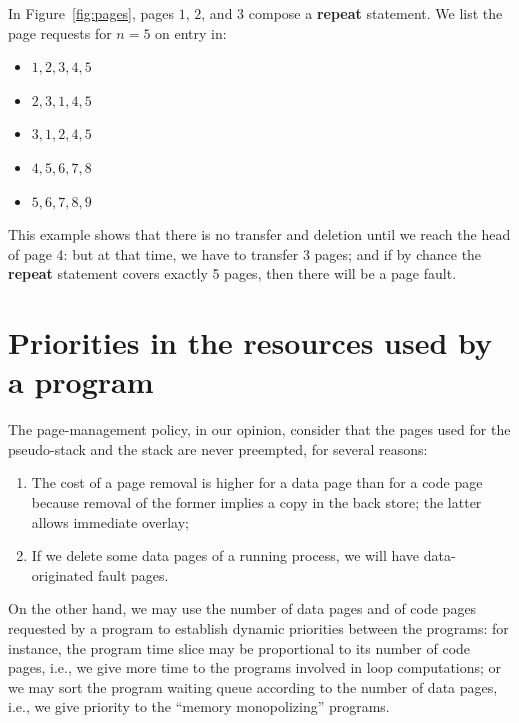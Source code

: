 \documentclass[openany,nobib]{tufte-book}
\newcommand{\kw}[1]{{\bf #1}}
\begin{document}
\begin{marginfigure}
\caption{A program with 10 pages.}
\label{fig:pages}
\end{marginfigure}

In Figure~\ref{fig:pages}, pages $1$, $2$, and $3$ compose a \kw{repeat}
statement. We
list the page requests for $n=5$ on entry in:
\begin{itemize}
\setlength\itemsep{0.1em}
    \item[$1$:] $1,2,3,4,5$
    \item[$2$:] $2,3,1,4,5$
    \item[$3$:] $3,1,2,4,5$
    \item[$4$:] $4,5,6,7,8$
    \item[$5$:] $5,6,7,8,9$
\end{itemize}

This example shows that there is no transfer and deletion until we reach the
head of page 4: but at that time, we have to transfer 3 pages; and if by chance
the \kw{repeat} statement covers exactly 5 pages, then there will be a page
fault.

\section{Priorities in the resources used by a program}

The page-management policy, in our opinion, consider that the pages used for
the pseudo-stack and the stack are never preempted, for several reasons:
\begin{enumerate}
    \item The cost of a page removal is higher for a data page than for a code
page because removal of the former implies a copy in the back store; the latter
allows immediate overlay;
    \item If we delete some data pages of a running process, we will have
data-originated fault pages.
\end{enumerate}
On the other hand, we may use the number of data pages and of code pages
requested by a program to establish dynamic priorities between the programs:
for instance, the program time slice may be proportional to its number of code
pages, i.e., we give more time to the programs involved in loop computations;
or we may sort the program waiting queue according to the number of data pages,
i.e., we give priority to the ``memory monopolizing'' programs.
\end{document}
